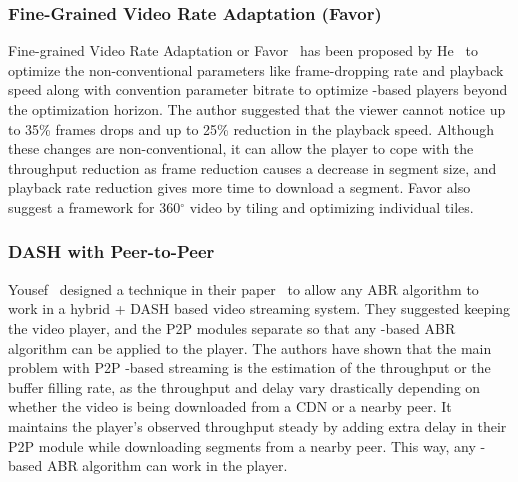 \subsubsection{Fine-Grained Video Rate Adaptation (Favor)}
Fine-grained Video Rate Adaptation or Favor~\cite{10.1145/3204949.3204957} has been proposed by He \etal\ to optimize the non-conventional parameters like frame-dropping rate and playback speed along with convention parameter bitrate to optimize -based players beyond the optimization horizon. The author suggested that the viewer cannot notice up to 35\% frames drops and up to 25\% reduction in the playback speed. Although these changes are non-conventional, it can allow the player to cope with the throughput reduction as frame reduction causes a decrease in segment size, and playback rate reduction gives more time to download a segment. Favor also suggest a framework for 360$^{\circ}$ video by tiling and optimizing individual tiles.

\subsubsection{DASH with Peer-to-Peer}
Yousef \etal\ designed a technique in their paper~\cite{10.1145/3339825.3391859} to allow any \ac{ABR} algorithm to work in a hybrid + \ac{DASH} based video streaming system. They suggested keeping the video player, and the P2P modules separate so that any -based \ac{ABR} algorithm can be applied to the player. The authors have shown that the main problem with \ac{P2P} -based streaming is the estimation of the throughput or the buffer filling rate, as the throughput and delay vary drastically depending on whether the video is being downloaded from a \ac{CDN} or a nearby peer. It maintains the player's observed throughput steady by adding extra delay in their \ac{P2P} module while downloading segments from a nearby peer. This way, any -based \ac{ABR} algorithm can work in the player.


